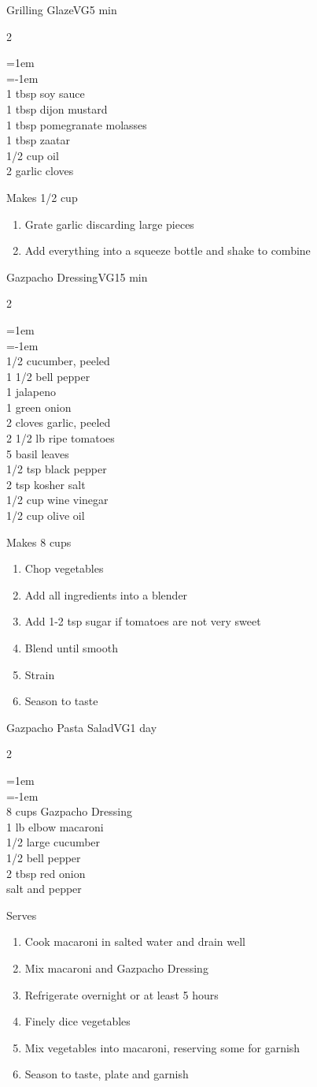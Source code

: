 \documentclass{article}
\newenvironment{recipe}[3][]
    {\begin{cardbase}[#1]{#2}{#3}
    \columnratio{0.333}
    \begin{paracol}{2}}
    {\end{paracol}\end{cardbase}}
\newcommand{\nextcolumn}{\switchcolumn}
\newenvironment{ingredients}
    {
    \begin{obeylines}
    \vspace{\parskip}
    \setlength{\parskip}{0.25em}
    \vspace{-0.25em}
    \leftskip=1em
    \parindent=-1em}
    {\end{obeylines}}
\newenvironment{steps}
    {\begin{enumerate}[leftmargin=*,topsep=0pt]}
    {\end{enumerate}}
\newcommand{\tag}[1]{\hspace{1em}#1}
\newcommand{\symboltag}[2]{\tag{#1\hspace{0.4em}#2}}
\newcommand{\totaltime}[1]{\symboltag{\raisebox{-0.1em}{\small\StopWatchEnd}}{#1}}
\begin{document}
\begin{recipe}{Grilling Glaze}{\tag{VG}\totaltime{5 min}}
\begin{ingredients}
1 tbsp soy sauce
1 tbsp dijon mustard
1 tbsp pomegranate molasses
1 tbsp zaatar
1/2 cup oil
2 garlic cloves
\end{ingredients}
\nextcolumn
Makes 1/2 cup
\begin{steps}
    \item Grate garlic discarding large pieces
    \item Add everything into a squeeze bottle and shake to combine
\end{steps}
\end{recipe}

\begin{recipe}{Gazpacho Dressing}{\tag{VG}\totaltime{15 min}}
\begin{ingredients}
1/2 cucumber, peeled
1 1/2 bell pepper
1 jalapeno
1 green onion
2 cloves garlic, peeled
2 1/2 lb ripe tomatoes
5 basil leaves
1/2 tsp black pepper
2 tsp kosher salt
1/2 cup wine vinegar
1/2 cup olive oil
\end{ingredients}
\nextcolumn
Makes 8 cups
\begin{steps}
    \item Chop vegetables
    \item Add all ingredients into a blender 
    \item Add 1-2 tsp sugar if tomatoes are not very sweet
    \item Blend until smooth
    \item Strain
    \item Season to taste
\end{steps}
\end{recipe}

\begin{recipe}{Gazpacho Pasta Salad}{\tag{VG}\totaltime{1 day}}
\begin{ingredients}
8 cups Gazpacho Dressing
1 lb elbow macaroni
1/2 large cucumber
1/2 bell pepper
2 tbsp red onion
salt and pepper
\end{ingredients}
\nextcolumn
Serves
\begin{steps}
    \item Cook macaroni in salted water and drain well
    \item Mix macaroni and Gazpacho Dressing
    \item Refrigerate overnight or at least 5 hours
    \item Finely dice vegetables
    \item Mix vegetables into macaroni, reserving some for garnish
    \item  Season to taste, plate and garnish
\end{steps}
\end{recipe}
\end{document}
